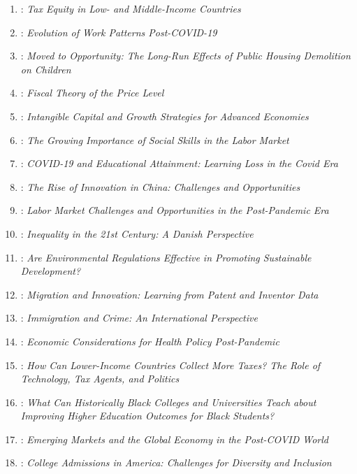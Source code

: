 \documentclass[
  a4paper,
  onecolumn,
  oneside]{scrartcl}
\providecommand{\tightlist}{%
  \setlength{\itemsep}{0pt}\setlength{\parskip}{0pt}}\usepackage{longtable,booktabs,array}
\begin{document}
\begin{tcolorbox}[enhanced jigsaw, toprule=.15mm, breakable, opacityback=0, arc=.35mm, left=2mm, leftrule=.75mm, colback=white, colframe=quarto-callout-tip-color-frame, rightrule=.15mm, bottomrule=.15mm]
\begin{enumerate}
\def\labelenumi{\arabic{enumi}.}
\tightlist
\item
  \citet{Bachas2024Tax}: \emph{Tax Equity in Low- and Middle-Income
  Countries}
\item
  \citet{Barrero2023Evolution}: \emph{Evolution of Work Patterns
  Post-COVID-19}
\item
  \citet{Chyn2021Neighborhoods}: \emph{Moved to Opportunity: The
  Long-Run Effects of Public Housing Demolition on Children}
\item
  \citet{Cochrane2022Fiscal}: \emph{Fiscal Theory of the Price Level}
\item
  \citet{Corrado2022Intangible}: \emph{Intangible Capital and Growth
  Strategies for Advanced Economies}
\item
  \citet{Deming2022Four}: \emph{The Growing Importance of Social Skills
  in the Labor Market}
\item
  \citet{Jack2023COVID}: \emph{COVID-19 and Educational Attainment:
  Learning Loss in the Covid Era}
\item
  \citet{Jones2021Rise}: \emph{The Rise of Innovation in China:
  Challenges and Opportunities}
\item
  \citet{Kearney2022Puzzle}: \emph{Labor Market Challenges and
  Opportunities in the Post-Pandemic Era}
\item
  \citet{Kreiner2022Danish}: \emph{Inequality in the 21st Century: A
  Danish Perspective}
\item
  \citet{Levinson2023Are}: \emph{Are Environmental Regulations Effective
  in Promoting Sustainable Development?}
\item
  \citet{Lissoni2024Migration}: \emph{Migration and Innovation: Learning
  from Patent and Inventor Data}
\item
  \citet{Marie2024Immigration}: \emph{Immigration and Crime: An
  International Perspective}
\item
  \citet{Morgan2023Economic}: \emph{Economic Considerations for Health
  Policy Post-Pandemic}
\item
  \citet{Okunogbe2024How}: \emph{How Can Lower-Income Countries Collect
  More Taxes? The Role of Technology, Tax Agents, and Politics}
\item
  \citet{Price2023What}: \emph{What Can Historically Black Colleges and
  Universities Teach about Improving Higher Education Outcomes for Black
  Students?}
\item
  \citet{Rogoff2022Emerging}: \emph{Emerging Markets and the Global
  Economy in the Post-COVID World}
\item
  \citet{Sloane2021College}: \emph{College Admissions in America:
  Challenges for Diversity and Inclusion}
\end{enumerate}

\end{tcolorbox}
\end{document}
